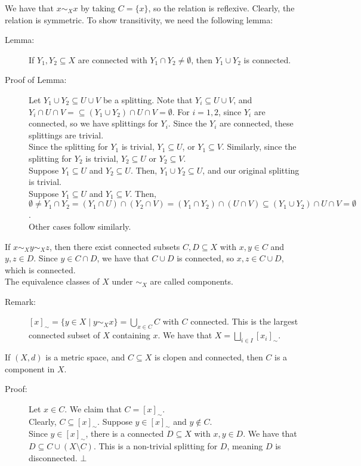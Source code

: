 \documentclass[9pt]{extarticle}
\begin{document}
  We have that $x\sim_{X}x$ by taking $C = \{x\}$, so the relation is reflexive. Clearly, the relation is symmetric. To show transitivity, we need the following lemma:
  \begin{description}
    \item[Lemma:] If $Y_1,Y_2\subseteq X$ are connected with $Y_1\cap Y_2\neq \emptyset$, then $Y_1\cup Y_2$ is connected.
    \item[Proof of Lemma:] Let $Y_1\cup Y_2\subseteq U\cup V$ be a splitting. Note that $Y_i \subseteq U\cup V$, and $Y_i \cap U\cap V = \subseteq (Y_1\cup Y_2)\cap U \cap V =\emptyset$. For $i=1,2$, since $Y_i$ are connected, so we have splittings for $Y_i$. Since the $Y_i$ are connected, these splittings are trivial.\\

      Since the splitting for $Y_1$ is trivial, $Y_1\subseteq U$, or $Y_1\subseteq V$. Similarly, since the splitting for $Y_2$ is trivial, $Y_2\subseteq U$ or $Y_2\subseteq V$.\\

      Suppose $Y_1\subseteq U$ and $Y_2\subseteq U$. Then, $Y_1\cup Y_2\subseteq U$, and our original splitting is trivial.\\

      Suppose $Y_1\subseteq U$ and $Y_1\subseteq V$. Then, $\emptyset \neq Y_1 \cap Y_2 = (Y_1\cap U)\cap (Y_2\cap V) = (Y_1\cap Y_2)\cap (U\cap V)\subseteq (Y_1\cup Y_2)\cap U\cap V = \emptyset$.\\

      Other cases follow similarly.
  \end{description}
  If $x\sim_{X}y\sim_{X}z$, then there exist connected subsets $C,D\subseteq X$ with $x,y\in C$ and $y,z\in D$. Since $y\in C\cap D$, we have that $C\cup D$ is connected, so $x,z\in C\cup D$, which is connected.\\

  The equivalence classes of $X$ under $\sim_{X}$ are called components.
  \begin{description}
    \item[Remark:] $[x]_{\sim} = \{y\in X\mid y\sim_{X}x\} = \bigcup_{x\in C} C $ with $C$ connected. This is the largest connected subset of $X$ containing $x$. We have that $X = \bigsqcup_{i\in I}[x_i]_{\sim}$.
  \end{description}
  If $(X,d)$ is a metric space, and $C\subseteq X$ is clopen and connected, then $C$ is a component in $X$.
  \begin{description}
    \item[Proof:] Let $x\in C$. We claim that $C = [x]_{\sim}$.\\

      Clearly, $C\subseteq [x]_{\sim}$. Suppose $y\in [x]_{\sim}$ and $y\notin C$.\\

      Since $y\in [x]_{\sim}$, there is a connected $D\subseteq X$ with $x,y\in D$. We have that $D\subseteq C\cup (X\setminus C)$. This is a non-trivial splitting for $D$, meaning $D$ is disconnected. $\bot$
  \end{description}
\end{document}
